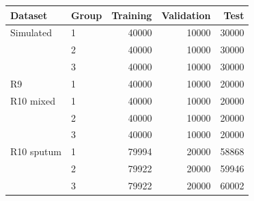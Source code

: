 \begin{tabular}{@{}llrrr@{}}
\toprule
Dataset & Group & Training & Validation & Test\\\midrule
Simulated & 1 & 40000 & 10000 & 30000\\
 & 2 & 40000 & 10000 & 30000\\
 & 3 & 40000 & 10000 & 30000\\
\addlinespace
R9 & 1 & 40000 & 10000 & 20000\\
\addlinespace
R10 mixed & 1 & 40000 & 10000 & 20000\\
 & 2 & 40000 & 10000 & 20000\\
 & 3 & 40000 & 10000 & 20000\\
\addlinespace
R10 sputum & 1 & 79994 & 20000 & 58868\\
 & 2 & 79922 & 20000 & 59946\\
 & 3 & 79922 & 20000 & 60002\\
\bottomrule
\end{tabular}
